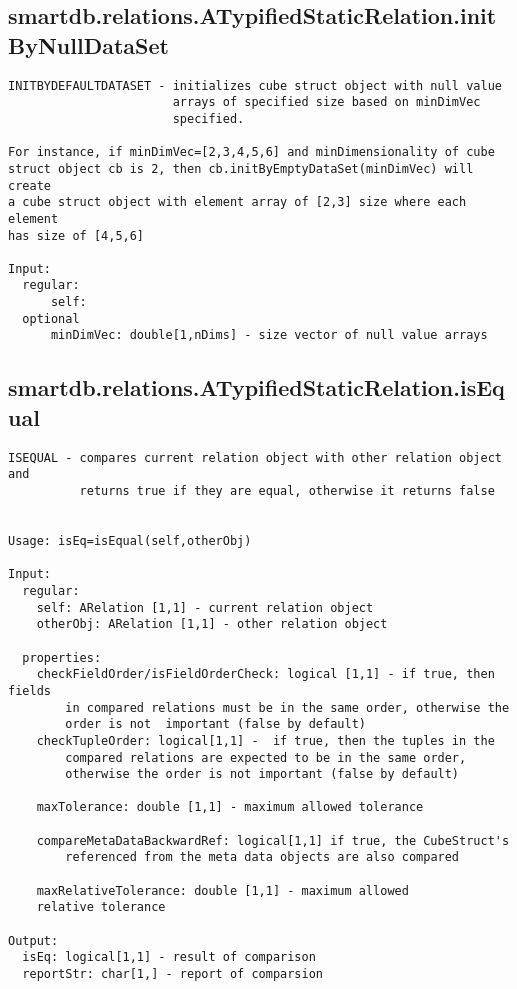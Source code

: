 \subsection{\texorpdfstring{smartdb.relations.ATypifiedStaticRelation.initByNullDataSet}{initByNullDataSet}}\label{method:smartdb.relations.ATypifiedStaticRelation.initByNullDataSet}
\begin{verbatim}
INITBYDEFAULTDATASET - initializes cube struct object with null value
                       arrays of specified size based on minDimVec
                       specified.

For instance, if minDimVec=[2,3,4,5,6] and minDimensionality of cube
struct object cb is 2, then cb.initByEmptyDataSet(minDimVec) will create
a cube struct object with element array of [2,3] size where each element
has size of [4,5,6]

Input:
  regular:
      self:
  optional
      minDimVec: double[1,nDims] - size vector of null value arrays
\end{verbatim}
\subsection{\texorpdfstring{smartdb.relations.ATypifiedStaticRelation.isEqual}{isEqual}}\label{method:smartdb.relations.ATypifiedStaticRelation.isEqual}
\begin{verbatim}
ISEQUAL - compares current relation object with other relation object and
          returns true if they are equal, otherwise it returns false


Usage: isEq=isEqual(self,otherObj)

Input:
  regular:
    self: ARelation [1,1] - current relation object
    otherObj: ARelation [1,1] - other relation object

  properties:
    checkFieldOrder/isFieldOrderCheck: logical [1,1] - if true, then fields
        in compared relations must be in the same order, otherwise the
        order is not  important (false by default)
    checkTupleOrder: logical[1,1] -  if true, then the tuples in the
        compared relations are expected to be in the same order,
        otherwise the order is not important (false by default)

    maxTolerance: double [1,1] - maximum allowed tolerance

    compareMetaDataBackwardRef: logical[1,1] if true, the CubeStruct's
        referenced from the meta data objects are also compared

    maxRelativeTolerance: double [1,1] - maximum allowed
    relative tolerance

Output:
  isEq: logical[1,1] - result of comparison
  reportStr: char[1,] - report of comparsion
\end{verbatim}
